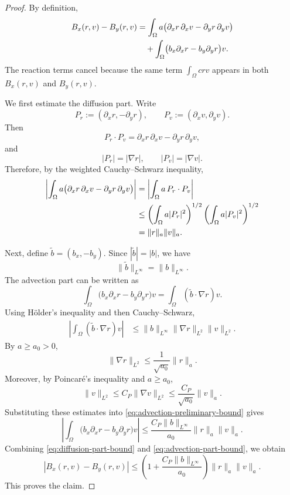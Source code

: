 \documentclass[11pt]{article}
\begin{document}
\begin{proof}
By definition,
\begin{align}
    B_x(r,v)-B_y(r,v)
    &=
    \int_\Omega a
    \bigl(\partial_x r\,\partial_x v
          -\partial_y r\,\partial_y v\bigr)
    \notag\\
    &\quad
    +
    \int_\Omega
    \bigl(b_x\partial_x r-b_y\partial_y r\bigr)v.
    \label{eq:Bx-minus-By-expanded}
\end{align}
The reaction terms cancel because the same term \(\int_\Omega crv\)
appears in both \(B_x(r,v)\) and \(B_y(r,v)\).

We first estimate the diffusion part.  Write
\[
    P_r:=(\partial_x r,-\partial_y r),
    \qquad
    P_v:=(\partial_x v,\partial_y v).
\]
Then
\[
    P_r\cdot P_v
    =
    \partial_x r\,\partial_x v
    -
    \partial_y r\,\partial_y v,
\]
and
\[
    |P_r|=|\nabla r|,
    \qquad
    |P_v|=|\nabla v|.
\]
Therefore, by the weighted Cauchy--Schwarz inequality,
\begin{align}
    \left|
    \int_\Omega a
    \bigl(\partial_x r\,\partial_x v
          -\partial_y r\,\partial_y v\bigr)
    \right|
    &=
    \left|
    \int_\Omega a\,P_r\cdot P_v
    \right|
    \notag\\
    &\le
    \left(\int_\Omega a|P_r|^2\right)^{1/2}
    \left(\int_\Omega a|P_v|^2\right)^{1/2}
    \notag\\
    &=
    \|r\|_a\|v\|_a.
    \label{eq:diffusion-part-bound}
\end{align}

Next, define \(\widetilde b=(b_x,-b_y)\).  Since
\(|\widetilde b|=|b|\), we have
\[
    \|\widetilde b\|_{L^\infty}=\|b\|_{L^\infty}.
\]
The advection part can be written as
\[
    \int_\Omega
    \bigl(b_x\partial_x r-b_y\partial_y r\bigr)v
    =
    \int_\Omega
    (\widetilde b\cdot\nabla r)v.
\]
Using Hölder's inequality and then Cauchy--Schwarz,
\begin{align}
    \left|
    \int_\Omega
    (\widetilde b\cdot\nabla r)v
    \right|
    &\le
    \|b\|_{L^\infty}
    \|\nabla r\|_{L^2}
    \|v\|_{L^2}.
    \label{eq:advection-preliminary-bound}
\end{align}
By \(a\ge a_0>0\),
\[
    \|\nabla r\|_{L^2}
    \le
    \frac{1}{\sqrt{a_0}}\|r\|_a.
\]
Moreover, by Poincaré's inequality and \(a\ge a_0\),
\[
    \|v\|_{L^2}
    \le
    C_P\|\nabla v\|_{L^2}
    \le
    \frac{C_P}{\sqrt{a_0}}\|v\|_a.
\]
Substituting these estimates into
\eqref{eq:advection-preliminary-bound} gives
\begin{equation}
    \left|
    \int_\Omega
    \bigl(b_x\partial_x r-b_y\partial_y r\bigr)v
    \right|
    \le
    \frac{C_P\|b\|_{L^\infty}}{a_0}
    \|r\|_a\|v\|_a.
    \label{eq:advection-part-bound}
\end{equation}
Combining \eqref{eq:diffusion-part-bound} and
\eqref{eq:advection-part-bound}, we obtain
\[
    |B_x(r,v)-B_y(r,v)|
    \le
    \left(
    1+
    \frac{C_P\|b\|_{L^\infty}}{a_0}
    \right)
    \|r\|_a\|v\|_a.
\]
This proves the claim.
\end{proof}
\end{document}

